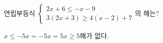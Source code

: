 연립부등식 $\begin{cases} 2x+6\le -x-9 \\ 3(2x+3)\ge 4(x-2)+7 \end{cases}$의 해는?
\begin{choices32}{$x\le -5$}{$x=-5$}{$x=5$}{$x\ge 5$}{해가 없다.}\end{choices32}
